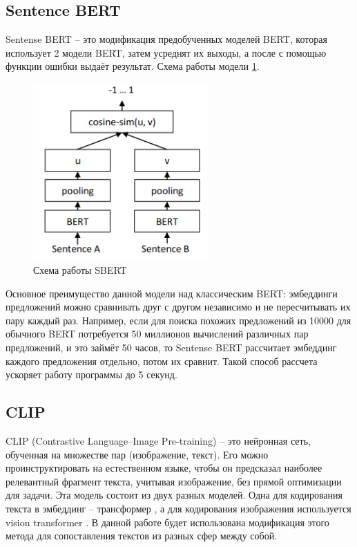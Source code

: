 \documentclass[PI, VKR]{HSEUniversity}
\begin{document}
\subsection{Sentence BERT}
\label{sec:org31f2e0d}
Sentense BERT \autocite{reimers_sentence-bert_2019} -- это модификация предобученных моделей BERT, которая использует 2 модели BERT, затем усреднят их выходы, а после с помощью функции ошибки выдаёт результат. Схема работы модели \ref{fig:sbert}.
\begin{figure}[hbp]
\centering
\includegraphics[width=0.6\textwidth]{img/sbert.png}
\caption{\label{fig:sbert}Схема работы SBERT}
\end{figure}
Основное преимущество данной модели над классическим BERT: эмбеддинги предложений можно сравнивать друг с другом независимо и не пересчитывать их пару каждый раз. Например, если для поиска похожих предложений из 10000 для обычного BERT потребуется 50 миллионов вычислений различных пар предложений, и это займёт 50 часов, то Sentense BERT рассчитает эмбеддинг каждого предложения отдельно, потом их сравнит. Такой способ рассчета ускоряет работу программы до 5 секунд.
\subsection{CLIP}
\label{sec:org4ab4247}
CLIP (Contrastive Language–Image Pre-training)\autocite{radford_learning_2021} -- это нейронная сеть, обученная на множестве пар (изображение, текст). Его можно проинструктировать на естественном языке, чтобы он предсказал наиболее релевантный фрагмент текста, учитывая изображение, без прямой оптимизации для задачи. Эта модель состоит из двух разных моделей. Одна для кодирования текста в эмбеддинг -- трансформер \autocite{vaswani_attention_2017}, а для кодирования изображения используется vision transformer \autocite{dosovitskiy_image_2021}. В данной работе будет использована модификация этого метода для сопоставления текстов из разных сфер между собой.
\end{document}
